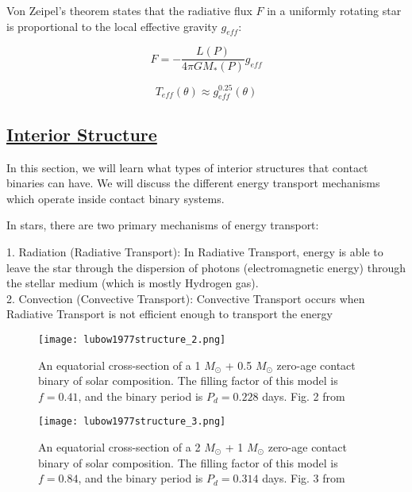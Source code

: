 \documentclass[12pt]{article} %
\numberwithin{equation}{section} %
\begin{document}
Von Zeipel's theorem states that the radiative flux $F$ in a uniformly rotating star is proportional to the local effective gravity $g_{eff}$:

\begin{equation} \label{von_zeipel}
F = - \frac{L(P)}{4\pi G M_{*}(P)}g_{eff}
\end{equation}

\begin{equation} \label{von_zeipel_2}
T_{eff}(\theta) \approx g_{eff}^{0.25}(\theta)
\end{equation}

\citep{von1924radiative.bib}


\citep{gazeas2006masses}

\subsection[Interior Structure]{\hyperlink{toc}{Interior Structure}} \label{sec: Interior Structure}

In this section, we will learn what types of interior structures that contact binaries can have. We will discuss the different energy transport mechanisms which operate inside contact binary systems.

In stars, there are two primary mechanisms of energy transport:

1. Radiation (Radiative Transport): In Radiative Transport, energy is able to leave the star through the dispersion of photons (electromagnetic energy) through the stellar medium (which is mostly Hydrogen gas). \\

2. Convection (Convective Transport): Convective Transport occurs when Radiative Transport is not efficient enough to transport the energy  \\

\begin{figure}[H]
\centering
\texttt{[image: lubow1977structure\_2.png]}
\caption{An equatorial cross-section of a 1 $M_{\odot}$ + 0.5 $M_{\odot}$ zero-age contact binary of solar composition. The filling factor of this model is $f = 0.41$, and the binary period is $P_{d} = 0.228$ days. Fig. 2 from \citet{lubow1977structure}}
\label{fig: lubow1977structure_2}
\end{figure}

\begin{figure}[H]
\centering
\texttt{[image: lubow1977structure\_3.png]}
\caption{An equatorial cross-section of a 2 $M_{\odot}$ + 1 $M_{\odot}$ zero-age contact binary of solar composition. The filling factor of this model is $f = 0.84$, and the binary period is $P_{d} = 0.314$ days. Fig. 3 from \citet{lubow1977structure}}
\label{fig: lubow1977structure_3}
\end{figure}
\end{document}
